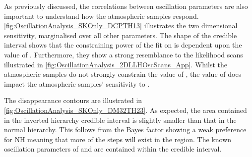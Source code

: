 As previously discussed, the correlations between oscillation parameters are also important to understand how the atmospheric samples respond. \autoref{fig:OscillationAnalysis_SKOnly_DCPTH13} illustrates the two dimensional  sensitivity, marginalised over all other parameters.
The shape of the \quickmath{1\sigma} credible interval shows that the constraining power of the fit on  is dependent upon the value of . Furthermore, they show a strong resemblance to the likelihood scans illustrated in \autoref{fig:OscillationAnalysis_2DLLHOscScans_App}. Whilst the atmospheric samples do not strongly constrain the value of , the value of  does impact the atmospheric samples' sensitivity to .

The  disappearance contours are illustrated in \autoref{fig:OscillationAnalysis_SKOnly_DM32TH23}. As expected, the area contained in the inverted hierarchy \quickmath{1\sigma} credible interval is slightly smaller than that in the normal hierarchy. This follows from the Bayes factor showing a weak preference for NH meaning that more of the steps will exist in the  region. The known oscillation parameters of  and  are contained within the \quickmath{1\sigma} credible interval.

